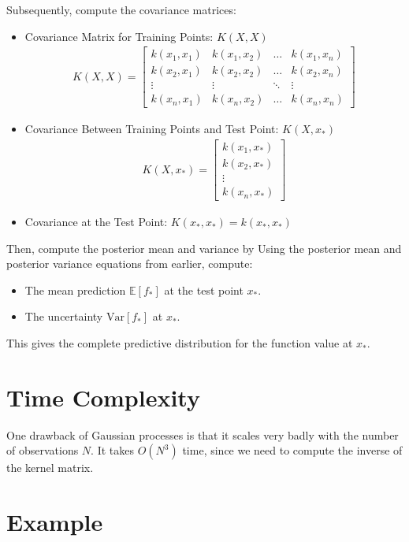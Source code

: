 Subsequently, compute the covariance matrices:
\begin{itemize}
	\item Covariance Matrix for Training Points: $K(X, X)$
		\begin{align*}
			K(X, X) = \begin{bmatrix}
				k(x_1, x_1) & k(x_1, x_2) & \dots & k(x_1, x_n) \\
				k(x_2, x_1) & k(x_2, x_2) & \dots & k(x_2, x_n) \\
				\vdots & \vdots & \ddots & \vdots \\
				k(x_n, x_1) & k(x_n, x_2) & \dots & k(x_n, x_n)
			\end{bmatrix}
		\end{align*}
	\item Covariance Between Training Points and Test Point: $K(X, x_*)$
		\begin{align*}
			K(X, x_*) = \begin{bmatrix}
				k(x_1, x_*) \\
				k(x_2, x_*) \\
				\vdots \\
				k(x_n, x_*)
			\end{bmatrix}
		\end{align*}
	\item Covariance at the Test Point: $K(x_*, x_*) = k(x_*, x_*)$
\end{itemize}
Then, compute the posterior mean and variance by Using the posterior mean and posterior variance equations from earlier, compute:
\begin{itemize}
	\item The mean prediction $\mathbb{E}[f_*]$ at the test point $x_*$.
	\item The uncertainty $\text{Var}[f_*]$ at $x_*$.
\end{itemize}
This gives the complete predictive distribution for the function value at $x_*$.

\section{Time Complexity}

One drawback of Gaussian processes is that it scales very badly with the number of observations $N$. It takes $O(N^3)$ time, since we need to compute the inverse of the kernel matrix.


\section{Example}

